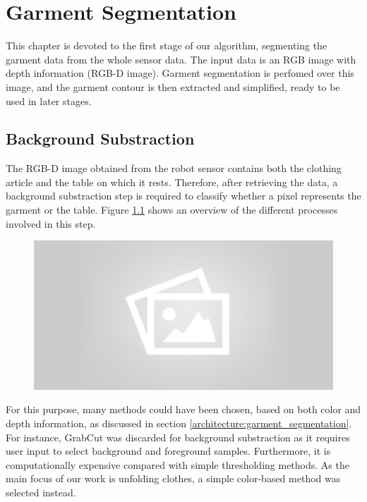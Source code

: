 \chapter{Garment Segmentation}
\label{garment_segmentation}

This chapter is devoted to the first stage of our algorithm, segmenting the garment data from the whole sensor data. The input data is an RGB image with depth information (RGB-D image). Garment segmentation is perfomed over this image, and the garment contour is then extracted and simplified, ready to be used in later stages.


\section{Background Substraction}
\label{background_substraction}

The RGB-D image obtained from the robot sensor contains both the clothing article and the table on which it rests. Therefore, after retrieving the data, a background substraction step is required to classify whether a pixel represents the garment or the table. Figure \ref{fig:background_substration_processes} shows an overview of the different processes involved in this step.


\begin{figure}[thpb]
    \centering
    \includegraphics[width=0.9
    \textwidth]{figures/placeholder2.png}
    \caption{}
    \label{fig:background_substration_processes}
\end{figure}

For this purpose, many methods could have been chosen, based on both color and depth information, as discussed in section \ref{architecture:garment_segmentation}. For instance, GrabCut  was discarded for background substraction as it requires user input to select background and foreground samples. Furthermore, it is computationally expensive compared with simple thresholding methods. As the main focus of our work is unfolding clothes, a simple color-based method was selected instead. 


